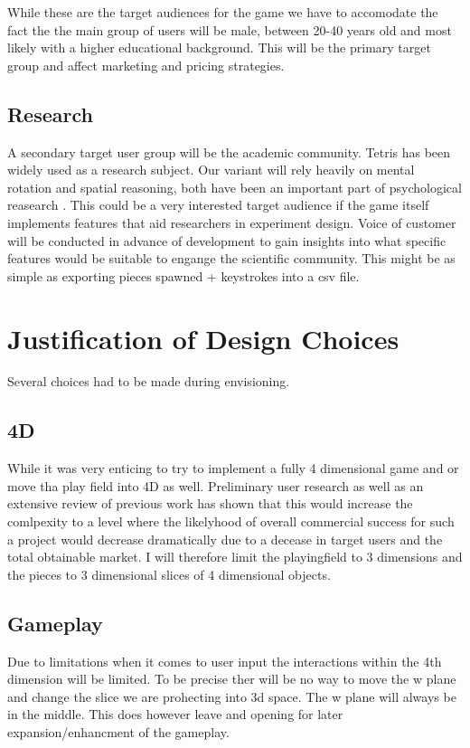 \documentclass{article}
\begin{document}
\newline
While these are the target audiences for the game we have to accomodate the fact the the main group of users will be male, between 20-40 years old and most likely with a higher educational background. This will be the primary target group and affect marketing and pricing strategies.
\subsection{Research}
A secondary target user group will be the academic community. Tetris has been widely used as a research subject. Our variant will rely heavily on mental rotation and spatial reasoning, both have been an important part of psychological reasearch \cite{COOPER197520} \cite{CORBALLIS1997100} \cite{Kornhaber_2020} \cite{Lau_zhu}. This could be a very interested target audience if the game itself implements features that aid researchers in experiment design. Voice of customer will be conducted in advance of development to gain insights into what specific features would be suitable to engange the scientific community.
This might be as simple as exporting pieces spawned + keystrokes into a csv file.

\section{Justification of Design Choices}
Several choices had to be made during envisioning.
\subsection{4D}
While it was very enticing to try to implement a fully 4 dimensional game and or move tha play field into 4D as well. Preliminary user research as well as an extensive review of previous work has shown that this would increase the comlpexity to a level where the likelyhood of overall commercial success for such a project would decrease dramatically due to a decease in target users and the total obtainable market. I will therefore limit the playingfield to 3 dimensions and the pieces to 3 dimensional slices of 4 dimensional objects.
\subsection{Gameplay}
Due to limitations when it comes to user input the interactions within the 4th dimension will be limited. To be precise ther will be no way to move the w plane and change the slice we are prohecting into 3d space. The w plane will always be in the middle. This does however leave and opening for later expansion/enhancment of the gameplay.
\end{document}
